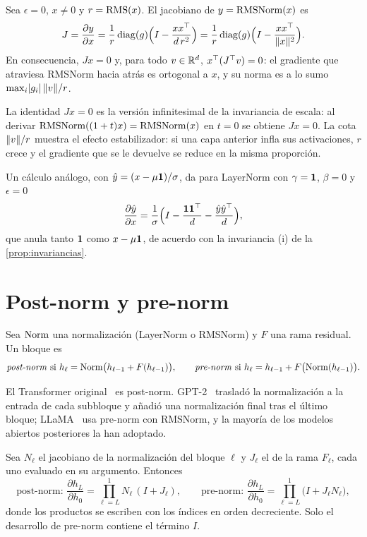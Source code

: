 \begin{teorema}\label{teo:jac-rms}
Sea $\epsilon=0$, $x\ne 0$ y $r=\operatorname{RMS}(x)$. El jacobiano de $y=\operatorname{RMSNorm}(x)$ es
\[
J=\frac{\partial y}{\partial x}=\frac1r\operatorname{diag}(g)\Bigl(I-\frac{xx^{\top}}{d\,r^{2}}\Bigr)
=\frac1r\operatorname{diag}(g)\Bigl(I-\frac{xx^{\top}}{\lVert x\rVert^{2}}\Bigr).
\]
En consecuencia, $Jx=0$ y, para todo $v\in\mathbb{R}^{d}$, $x^{\top}(J^{\top} v)=0$: el gradiente que atraviesa RMSNorm hacia atrás es ortogonal a $x$, y su norma es a lo sumo $\max_i\lvert g_i\rvert\,\lVert v\rVert/r$.
\end{teorema}

La identidad $Jx=0$ es la versión infinitesimal de la invariancia de escala: al derivar $\operatorname{RMSNorm}((1+t)x)=\operatorname{RMSNorm}(x)$ en $t=0$ se obtiene $Jx=0$. La cota $\lVert v\rVert/r$ muestra el efecto estabilizador: si una capa anterior infla sus activaciones, $r$ crece y el gradiente que se le devuelve se reduce en la misma proporción.

\begin{observacion}
Un cálculo análogo, con $\hat y=(x-\mu\mathbf{1})/\sigma$, da para LayerNorm con $\gamma=\mathbf{1}$, $\beta=0$ y $\epsilon=0$
\[
\frac{\partial\hat y}{\partial x}=\frac1\sigma\Bigl(I-\frac{\mathbf{1}\mathbf{1}^{\top}}{d}-\frac{\hat y\hat y^{\top}}{d}\Bigr),
\]
que anula tanto $\mathbf{1}$ como $x-\mu\mathbf{1}$, de acuerdo con la invariancia (i) de la \cref{prop:invariancias}.
\end{observacion}

\section{Post-norm y pre-norm}

\begin{definicion}\label{def:pre-post}
Sea $\operatorname{Norm}$ una normalización (LayerNorm o RMSNorm) y $F$ una rama residual. Un bloque es
\[
\text{\emph{post-norm} si } h_\ell=\operatorname{Norm}\bigl(h_{\ell-1}+F(h_{\ell-1})\bigr),\qquad
\text{\emph{pre-norm} si } h_\ell=h_{\ell-1}+F\bigl(\operatorname{Norm}(h_{\ell-1})\bigr).
\]
\end{definicion}

El Transformer original~\cite{vaswani} es post-norm. GPT-2~\cite[§2.3]{gpt2} trasladó la normalización a la entrada de cada subbloque y añadió una normalización final tras el último bloque; LLaMA~\cite{llama} usa pre-norm con RMSNorm, y la mayoría de los modelos abiertos posteriores la han adoptado.

\begin{proposicion}\label{prop:jac-pre-post}
Sea $N_\ell$ el jacobiano de la normalización del bloque $\ell$ y $J_\ell$ el de la rama $F_\ell$, cada uno evaluado en su argumento. Entonces
\[
\text{post-norm: }\frac{\partial h_L}{\partial h_0}=\prod_{\ell=L}^{1}N_\ell\,(I+J_\ell),\qquad
\text{pre-norm: }\frac{\partial h_L}{\partial h_0}=\prod_{\ell=L}^{1}\bigl(I+J_\ell N_\ell\bigr),
\]
donde los productos se escriben con los índices en orden decreciente. Solo el desarrollo de pre-norm contiene el término $I$.
\end{proposicion}

